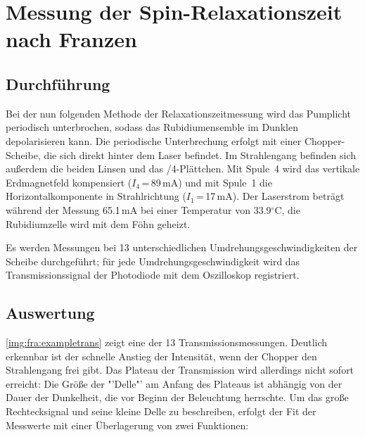 \section{Messung der Spin-Relaxationszeit nach Franzen}
\subsection{Durchführung}
Bei der nun folgenden Methode der Relaxationszeitmessung wird das Pumplicht periodisch unterbrochen,
sodass das Rubidiumensemble im Dunklen depolarisieren kann.
Die periodische Unterbrechung erfolgt mit einer Chopper-Scheibe,
die sich direkt hinter dem Laser befindet.
Im Strahlengang befinden sich außerdem die beiden Linsen und das \textlambda/4-Plättchen.
Mit Spule~4 wird das vertikale Erdmagnetfeld kompensiert ($I_4$\,=\,89\,mA) und mit Spule~1 die
Horizontalkomponente in Strahlrichtung ($I_1$\,=\,17\,mA).
Der Laserstrom beträgt während der Messung 65.1\,mA bei einer Temperatur von 33.9$^\circ$C,
die Rubidiumzelle wird mit dem Föhn geheizt.

Es werden Messungen bei 13 unterschiedlichen Umdrehungsgeschwindigkeiten der Scheibe durchgeführt;
für jede Umdrehungsgeschwindigkeit wird das Transmissionssignal der Photodiode mit dem Oszilloskop registriert.


\subsection{Auswertung}

\autoref{img:fra:exampletrans} zeigt eine der 13 Transmissionsmessungen.
Deutlich erkennbar ist der schnelle Anstieg der Intensität, wenn der Chopper den Strahlengang frei gibt.
Das Plateau der Transmission wird allerdings nicht sofort erreicht:
Die Größe der "'Delle"' am Anfang des Plateaus ist abhängig von der Dauer der Dunkelheit,
die vor Beginn der Beleuchtung herrschte.
Um das große Rechtecksignal und seine kleine Delle zu beschreiben,
erfolgt der Fit der Messwerte mit einer Überlagerung von zwei Funktionen:


